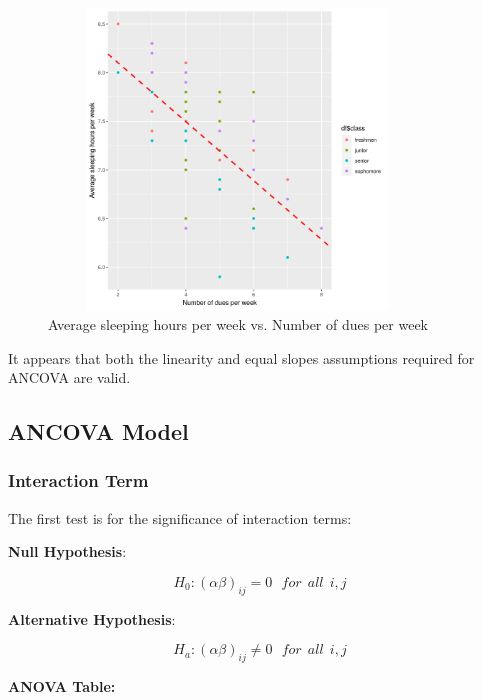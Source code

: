 \documentclass{article} %
\begin{document}
\begin{figure}[H]
	\begin{center}
		\includegraphics[height=8cm, width=10cm]{6.png}
	\end{center}
	\caption{Average sleeping hours per week vs. Number of dues per week}
\end{figure}


It appears that both the linearity and equal slopes assumptions required for
ANCOVA are valid. 

\subsection{ANCOVA Model}

\subsubsection{Interaction Term}

The first test is for the significance of  interaction terms:

\textbf{Null Hypothesis}:

$$H_0 : (\alpha \beta)_{ij} = 0 \:\:\: for \:\: all \:\:  i, j$$

\textbf{Alternative Hypothesis}:

$$H_a : (\alpha \beta)_{ij} \neq 0 \:\:\: for \:\: all \:\: i, j$$


\textbf{ANOVA Table:}
\end{document}
